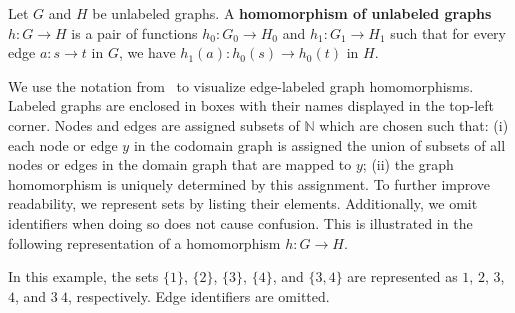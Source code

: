 \begin{definition}
    \label{def:unlabeled_graph:homomorphism}
    Let \( G \) and \( H \) be unlabeled graphs. A \textbf{homomorphism of unlabeled graphs} $h: G \to H$ is a pair of functions $h_0: G_0 \to H_0 $ and $h_1: G_1 \to H_1$ such that for every edge \( a: s \to t \) in \( G \), we have \( h_1(a) : h_0(s) \to h_0(t) \) in \( H \).
\end{definition}


\begin{notation}
    We use the notation from~\cite[Notation 1]{overbeek2023apbpotutorial} to visualize edge-labeled graph homomorphisms. Labeled graphs are enclosed in boxes with their names displayed in the top-left corner. Nodes
     and edges are assigned subsets of \(\mathbb{N}\) which are chosen such that: (i) each node or edge \( y \) in the codomain graph is assigned the union of subsets of all nodes or edges in the domain graph that are mapped to \( y \); (ii) the graph homomorphism is uniquely determined by this assignment. To further improve readability, we represent sets by listing their elements. Additionally, we omit identifiers when doing so does not cause confusion. This is illustrated in the following representation of a homomorphism \( h: G \to H \).
    
   \begin{center}
    \end{center}  
    In this example, the sets \(\{1\}\), \(\{2\}\), \(\{3\}\), \(\{4\}\), and \(\{3,4\}\) are represented as \(1\), \(2\), \(3\), \(4\), and \(3\ 4\), respectively. Edge identifiers are omitted.
\end{notation}
